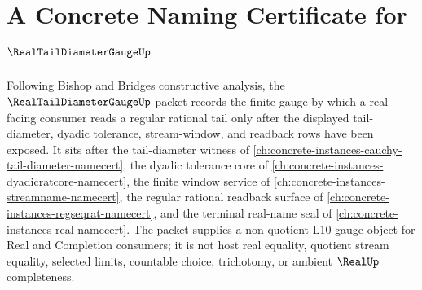\chapter{A Concrete Naming Certificate for $\RealTailDiameterGaugeUp$}
\label{ch:concrete-instances-real-tail-diameter-gauge-namecert}

Following Bishop and Bridges constructive analysis, the $\RealTailDiameterGaugeUp$ packet records the finite gauge by which a real-facing consumer reads a regular rational tail only after the displayed tail-diameter, dyadic tolerance, stream-window, and readback rows have been exposed. It sits after the tail-diameter witness of \autoref{ch:concrete-instances-cauchy-tail-diameter-namecert}, the dyadic tolerance core of \autoref{ch:concrete-instances-dyadicratcore-namecert}, the finite window service of \autoref{ch:concrete-instances-streamname-namecert}, the regular rational readback surface of \autoref{ch:concrete-instances-regseqrat-namecert}, and the terminal real-name seal of \autoref{ch:concrete-instances-real-namecert}. The packet supplies a non-quotient L10 gauge object for Real and Completion consumers; it is not host real equality, quotient stream equality, selected limits, countable choice, trichotomy, or ambient $\RealUp$ completeness.

